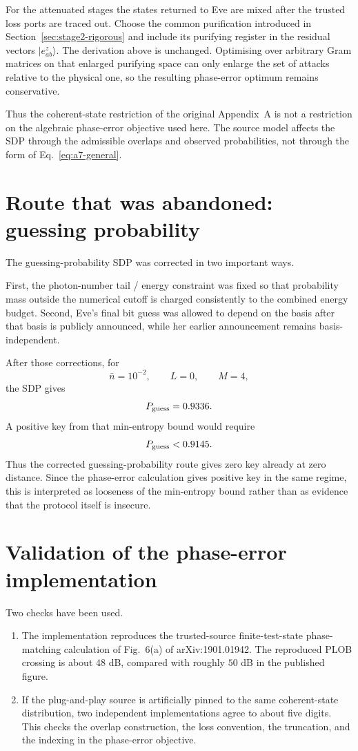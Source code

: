 \documentclass[11pt]{article}
\theoremstyle{remark}
\begin{document}
For the attenuated stages the states returned to Eve are mixed after the
trusted loss ports are traced out.  Choose the common purification introduced
in Section~\ref{sec:stage2-rigorous} and include its purifying register in the
residual vectors \(|e^z_{ab}\rangle\).  The derivation above is unchanged.
Optimising over arbitrary Gram matrices on that enlarged purifying space can
only enlarge the set of attacks relative to the physical one, so the resulting
phase-error optimum remains conservative.

Thus the coherent-state restriction of the original Appendix~A is not a
restriction on the algebraic phase-error objective used here.  The source
model affects the SDP through the admissible overlaps and observed
probabilities, not through the form of Eq.~\eqref{eq:a7-general}.


\section{Route that was abandoned: guessing probability}

The guessing-probability SDP was corrected in two important ways.

First, the photon-number tail / energy constraint was fixed so that probability
mass outside the numerical cutoff is charged consistently to the combined
energy budget. Second, Eve's final bit guess was allowed to depend on the
basis after that basis is publicly announced, while her earlier announcement
remains basis-independent.

After those corrections, for
\[
    \bar n = 10^{-2},
    \qquad L=0,
    \qquad M=4,
\]
the SDP gives
\[
    P_{\rm guess}=0.9336.
\]
A positive key from that min-entropy bound would require
\[
    P_{\rm guess}<0.9145.
\]
Thus the corrected guessing-probability route gives zero key already at zero
distance. Since the phase-error calculation gives positive key in the same
regime, this is interpreted as looseness of the min-entropy bound rather than
as evidence that the protocol itself is insecure.

\section{Validation of the phase-error implementation}

Two checks have been used.

\begin{enumerate}
    \item The implementation reproduces the trusted-source finite-test-state
    phase-matching calculation of Fig.~6(a) of arXiv:1901.01942. The
    reproduced PLOB crossing is about \(48\) dB, compared with roughly
    \(50\) dB in the published figure.

    \item If the plug-and-play source is artificially pinned to the same
    coherent-state distribution, two independent implementations agree to
    about five digits. This checks the overlap construction, the loss
    convention, the truncation, and the indexing in the phase-error objective.
\end{enumerate}
\end{document}
